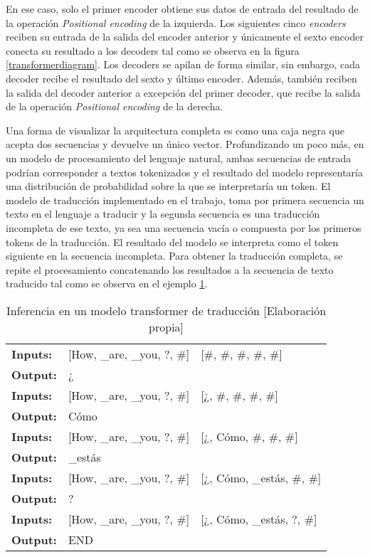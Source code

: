 En ese caso, solo el primer encoder obtiene sus datos de entrada del resultado de la operación \textit{Positional encoding} de la izquierda. Los siguientes cinco \textit{encoders} reciben su entrada de la salida del encoder anterior y únicamente el sexto encoder conecta su resultado a los decoders tal como se observa en la figura \ref{transformerdiagram}.
Los decoders se apilan de forma similar, sin embargo, cada decoder recibe el resultado del sexto y último encoder. Además, también reciben la salida del decoder anterior a excepción del primer decoder, que recibe la salida de la operación \textit{Positional encoding} de la derecha.

Una forma de visualizar la arquitectura completa es como una caja negra que acepta dos secuencias y devuelve un único vector. Profundizando un poco más, en un modelo de procesamiento del lenguaje natural, ambas secuencias de entrada podrían corresponder a textos tokenizados y el resultado del modelo representaría una distribución de probabilidad sobre la que se interpretaría un token. El modelo de traducción implementado en el trabajo, toma por primera secuencia un texto en el lenguaje a traducir y la segunda secuencia es una traducción incompleta de ese texto, ya sea una secuencia vacía o compuesta por los primeros tokens de la traducción. El resultado del modelo se interpreta como el token siguiente en la secuencia incompleta. Para obtener la traducción completa, se repite el procesamiento concatenando los resultados a la secuencia de texto traducido tal como se observa en el ejemplo \ref{transforminexample}.

\begin{table}[H]
    \begin{center}
        \begin{tabular}{ l l l }
        \hline
        \textbf{Inputs:} & [How, \_are, \_you, ?, \#] & [\#, \#, \#, \#, \#] \\ 
        \textbf{Output:} & ¿ \\  
        \hline
        \textbf{Inputs:} & [How, \_are, \_you, ?, \#] & [¿, \#, \#, \#, \#] \\ 
        \textbf{Output:} & Cómo \\  
        \hline
        \textbf{Inputs:} & [How, \_are, \_you, ?, \#] & [¿, Cómo, \#, \#, \#] \\ 
        \textbf{Output:} & \_estás \\  
        \hline
        \textbf{Inputs:} & [How, \_are, \_you, ?, \#] & [¿, Cómo, \_estás, \#, \#] \\ 
        \textbf{Output:} & ? \\  
        \hline
        \textbf{Inputs:} & [How, \_are, \_you, ?, \#] & [¿, Cómo, \_estás, ?, \#] \\ 
        \textbf{Output:} & END \\  
        \hline
        \end{tabular}
        \caption{Inferencia en un modelo transformer de traducción [Elaboración propia]}\label{transforminexample}
    \end{center}
\end{table}

